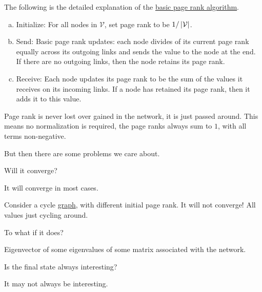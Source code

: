 \begin{remark}
	The following is the detailed explanation of the \hyperref[algo:basic-page-rank-algorithm]{basic page rank algorithm}.
	\begin{enumerate}[(a)]
		\item\label{algo:basic-page-rank-algorithm:initialize}
		Initialize: For all nodes in \(\mathcal{V}\), set page rank to be \(1 / \left\vert \mathcal{\MakeUppercase{v}}  \right\vert\).
		\item\label{algo:basic-page-rank-algorithm:send}
		Send: Basic page rank updates: each node divides of its current page rank equally across its outgoing
		links and sends the value to the node at the end. If there are no outgoing links, then the node retains its page rank.
		\item \label{algo:basic-page-rank-algorithm:receive}
		      Receive: Each node updates its page rank to be the sum of the values it receives on its incoming links. If
		      a node has retained its page rank, then it adds it to this value.
	\end{enumerate}
\end{remark}

\begin{note}
	Page rank is never lost over gained in the network, it is just passed around. This means no normalization is required,
	the page ranks always sum to \(1\), with all terms non-negative.
\end{note}

But then there are some problems we care about.
\begin{problem}
Will it converge?
\end{problem}
\begin{answer}
	It will converge in most cases.
\end{answer}

\begin{eg}
	Consider a cycle \hyperref[def:graph]{graph}, with different initial page rank. It will not converge! All values just cycling around.
\end{eg}

\begin{problem}
To what if it does?
\end{problem}
\begin{answer}
	Eigenvector of some eigenvalues of some matrix associated with the network.
\end{answer}

\begin{problem}
Is the final state always interesting?
\end{problem}
\begin{answer}
	It may not always be interesting.
\end{answer}


